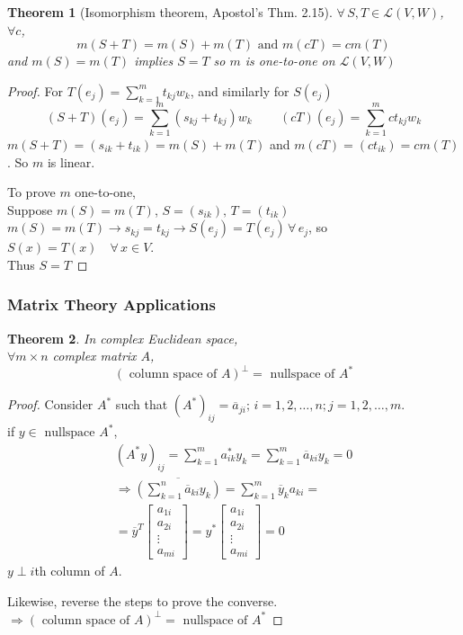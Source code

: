 \documentclass[twoside]{amsart}
\theoremstyle{plain}
\newtheorem{theorem}{Theorem}
\theoremstyle{definition}
\begin{document}
\begin{theorem}[Isomorphism theorem, Apostol's Thm. 2.15] $\forall \, S,T \in \mathcal{L}(V,W)$, $\forall c $,
\[
m(S+T) = m(S) + m(T) \text{ and } m(cT) = cm(T)
\]
  and $m(S) = m(T)$ implies $S=T$ so $m$ is one-to-one on $\mathcal{L}(V,W)$
\end{theorem}
\begin{proof}
  For $T(e_j) = \sum_{k=1}^m t_{kj} w_k $, and similarly for $S(e_j)$ \\
  \[
  (S+T)(e_j) = \sum_{k=1}^m (s_{kj} + t_{kj})w_k  \quad \quad \, (cT)(e_j) = \sum_{k=1}^m ct_{kj} w_k 
\]
$m(S+T) = (s_{ik} + t_{ik}) = m(S) + m(T)$ and $m(cT) = (ct_{ik} ) = cm(T)$.  So $m$ is linear.  

To prove $m$ one-to-one,  \\
\quad Suppose $m(S) = m(T)$, $S= (s_{ik}), \, T = (t_{ik})$ \\
$m(S) = m(T) \to s_{kj} = t_{kj} \to S(e_j) = T(e_j) \, \forall \, e_j$, so $S(x) = T(x) \quad  \forall \, x \in V$.   \\
Thus $S=T$
\end{proof}

\subsubsection{Matrix Theory Applications }
\begin{theorem}
  In complex Euclidean space, \\
  $\forall m \times n$ complex matrix $A$, 
  \begin{equation*}
    ( \text{ column space of } A )^{\perp} = \text{ nullspace of } A^*
  \end{equation*}
\end{theorem}
\begin{proof}
  Consider $A^*$ such that $(A^*)_{ij} = \overline{a}_{ji}; \, i = 1,2 ,\dots , n; j=1,2, \dots , m$.  \\
  if $y\in \text{ nullspace } A^*$, 
  \begin{gather*}
    (A^* y)_{ij} = \sum_{k=1}^m a_{ik}^* y_k = \sum_{k=1}^m \overline{a}_{ki} y_k =0 \\
    \Longrightarrow \overline{ \left( \sum_{k=1}^n \overline{a}_{ki} y_k \right) } = \sum_{k=1}^m \overline{y}_k a_{ki} = \\
    = \overline{y}^{T} \left[ \begin{matrix} a_{1i} \\ a_{2i} \\ \vdots \\ a_{mi} \end{matrix} \right] = y^* \left[ \begin{matrix} a_{1i} \\ a_{2i} \\ \vdots \\ a_{mi} \end{matrix} \right] = 0 
  \end{gather*}
  $y \perp i$th column of $A$.  

Likewise, reverse the steps to prove the converse.  \\
$\Longrightarrow ( \text{ column space of } A )^{\perp} = \text{ nullspace of } A^* $
\end{proof}
\end{document}
